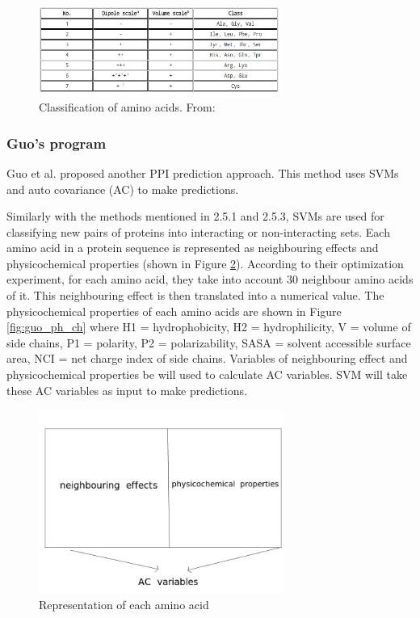 \begin{figure}[h!]
\begin{center}
\includegraphics[height =5 cm, width = 8cm]{img/shen_clas.jpeg}
\caption{Classification of amino acids. From: \cite{Shen07_PPIpred} \label{fig:shen_clas}}
\end{center}
\end{figure}

\subsubsection{Guo's program}
Guo et al. \cite{Guo08_PPIpred} proposed another PPI prediction approach.
This method uses SVMs and auto covariance (AC) to make predictions.

Similarly with the methods mentioned in 2.5.1 and 2.5.3, SVMs are used for classifying new pairs of proteins into interacting or non-interacting sets. Each amino acid in a protein sequence is represented as neighbouring effects and physicochemical properties (shown in Figure \ref{fig:guo_ac}). According to their optimization experiment, for each amino acid, they take into account 30 neighbour amino acids of it. This neighbouring effect is then translated into a numerical value. The physicochemical properties of each amino acids are shown in Figure \ref{fig:guo_ph_ch} where H1 = hydrophobicity, H2 = hydrophilicity, V = volume of side chains, P1 = polarity, P2 = polarizability, SASA = solvent accessible surface area, NCI = net charge index of side chains. Variables of neighbouring effect and physicochemical properties be will used to calculate AC variables. SVM will take these AC variables as input to make predictions.
\begin{figure}[h!]
\begin{center}
\includegraphics[height =6 cm, width = 8cm]{img/guo_ac.jpg}
\caption{Representation of each amino acid\label{fig:guo_ac}}
\end{center}
\end{figure}

